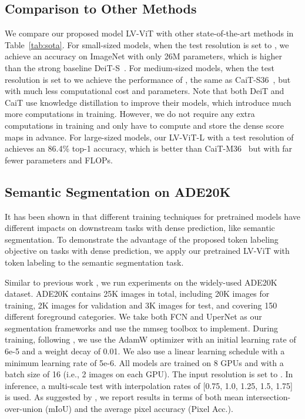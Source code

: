 \documentclass{article}
\newcommand{\nameofmethod}{LV-ViT}
\begin{document}
\subsection{Comparison to Other Methods} \label{sec:comp_others}
We compare our proposed model \nameofmethod{} with other state-of-the-art methods in Table~\ref{tab:sota}.
For small-sized models, when the test resolution is set to , 
we achieve an  accuracy on ImageNet with only 26M parameters, which is 
higher than the strong baseline DeiT-S~\cite{touvron2020training}. 
For medium-sized models, when the test resolution is set to  
we achieve the performance of , the same as CaiT-S36~\cite{touvron2021going}, but with much less computational cost and parameters. 
Note that both DeiT and CaiT use knowledge distillation to improve their models,
which introduce much more computations in training.
However, we do not require any extra computations in training and only have to compute and store the dense score maps in advance.
For large-sized models, our LV-ViT-L with a test resolution of  achieves an 86.4\% top-1 accuracy, which is better than CaiT-M36~\cite{touvron2021going}  but with far fewer parameters and FLOPs.


\subsection{Semantic Segmentation on ADE20K}

It has been shown in \cite{he2019bag} that different training techniques for pretrained models have different impacts on downstream tasks with dense prediction, 
like semantic segmentation.
To demonstrate the advantage of the proposed token labeling objective on tasks with dense prediction, we apply our pretrained \nameofmethod{} with token labeling to the semantic segmentation task.




Similar to previous work \cite{liu2021swin}, we run experiments on the widely-used ADE20K \cite{zhou2019semantic} dataset. 
ADE20K contains 25K images in total, including 20K images for training, 2K images for validation and 3K images for test, and covering 150 different foreground categories.
We take both FCN \cite{long2015fully} and UperNet \cite{xiao2018unified} as our segmentation frameworks and use the mmseg toolbox to implement.
During training, following \cite{liu2021swin}, we use the AdamW optimizer with an initial learning rate of 6e-5 and a weight decay
of 0.01.
We also use a linear learning schedule with a minimum learning rate of 5e-6.
All models are trained on 8 GPUs and with a batch size of 16 (i.e., 2 images on each GPU).
The input resolution is set to .
In inference, a multi-scale test with interpolation rates of 
[0.75, 1.0, 1.25, 1.5, 1.75] is used.
As suggested by \cite{zhou2019semantic}, we report results in terms of both mean intersection-over-union (mIoU) and the average pixel accuracy (Pixel Acc.).
\end{document}
